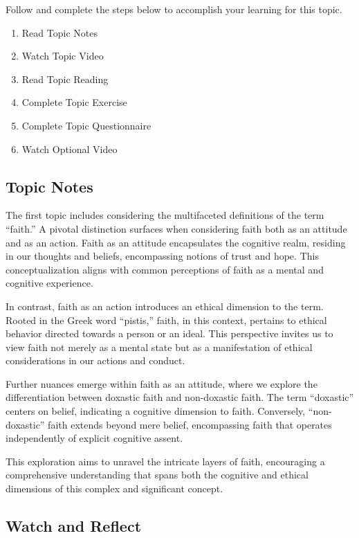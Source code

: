 \documentclass[
]{book}
\providecommand{\tightlist}{%
  \setlength{\itemsep}{0pt}\setlength{\parskip}{0pt}}
\begin{document}
Follow and complete the steps below to accomplish your learning for this topic.

\begin{enumerate}
\def\labelenumi{\arabic{enumi}.}
\tightlist
\item
  Read Topic Notes
\item
  Watch Topic Video
\item
  Read Topic Reading
\item
  Complete Topic Exercise
\item
  Complete Topic Questionnaire
\item
  Watch Optional Video
\end{enumerate}

\hypertarget{topic-notes-4}{%
\subsection*{Topic Notes}\label{topic-notes-4}}

The first topic includes considering the multifaceted definitions of the term ``faith.'' A pivotal distinction surfaces when considering faith both as an attitude and as an action. Faith as an attitude encapsulates the cognitive realm, residing in our thoughts and beliefs, encompassing notions of trust and hope. This conceptualization aligns with common perceptions of faith as a mental and cognitive experience.

In contrast, faith as an action introduces an ethical dimension to the term. Rooted in the Greek word ``pistis,'' faith, in this context, pertains to ethical behavior directed towards a person or an ideal. This perspective invites us to view faith not merely as a mental state but as a manifestation of ethical considerations in our actions and conduct.

Further nuances emerge within faith as an attitude, where we explore the differentiation between doxastic faith and non-doxastic faith. The term ``doxastic'' centers on belief, indicating a cognitive dimension to faith. Conversely, ``non-doxastic'' faith extends beyond mere belief, encompassing faith that operates independently of explicit cognitive assent.

This exploration aims to unravel the intricate layers of faith, encouraging a comprehensive understanding that spans both the cognitive and ethical dimensions of this complex and significant concept.

\hypertarget{watch-and-reflect-8}{%
\subsection*{Watch and Reflect}\label{watch-and-reflect-8}}
\end{document}
